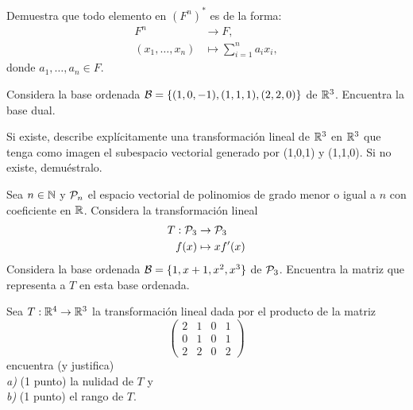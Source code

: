 \documentclass[12pt,a4paper]{book}
\newcommand{\llaves}[1]{\{#1\}}
\begin{document}
    \begin{ejercicio}
        Demuestra que todo elemento en $(F^{n})^{\ast}$ es de la forma:
        \begin{align*}
            F^{n} & \to F,\\
            (x_{1}, \dots, x_{n}) & \mapsto \sum_{i = 1}^{n}a_{i}x_{i},
        \end{align*}
        donde $a_{1}, \dots, a_{n} \in F$.
    \end{ejercicio}

    \begin{ejercicio}
        Considera la base ordenada $\BB = \llaves{(1, 0 ,-1), (1, 1, 1), (2, 2, 0)}$ de $\mathbb{R}^{3}$. Encuentra la base dual.
    \end{ejercicio}

    \begin{ejercicio}
        Si existe, describe explícitamente una transformación lineal de $\mathbb{R}^{3}$
        en $\mathbb{R}^{3}$ que tenga como imagen el subespacio vectorial generado por (1,0,1) y
        (1,1,0). Si no existe, demuéstralo.
    \end{ejercicio}

    \begin{ejercicio}
        Sea $n\in\mathbb{N}$ y $\mathcal{P}_{n}$ el espacio vectorial de polinomios
        de grado menor o igual a $n$ con coeficiente en $\mathbb{R}$. Considera la transformación
        lineal
        \begin{align*}
            T:\mathcal{P}_{3}&\to\mathcal{P}_{3}\\
            f(x)&\mapsto xf^{\prime}(x)
        \end{align*}
        Considera la base ordenada $\mathcal{B}=\{1,x+1,x^{2},x^{3}\}$ de $\mathcal{P}_{3}$. Encuentra la matriz
        que representa a $T$ en esta base ordenada.
    \end{ejercicio}

    \begin{ejercicio}
        Sea $T:\mathbb{R}^{4}\to\mathbb{R}^{3}$ la transformación lineal dada por el producto de la matriz
        \begin{equation*}
            \begin{pmatrix}
                2 & 1 & 0 & 1\\
                0 & 1 & 0 & 1\\
                2 & 2 & 0 & 2
            \end{pmatrix}
        \end{equation*}
        encuentra (y justifica)\\
        \textit{a)} (1 punto) la nulidad de $T$ y\\
        \textit{b)} (1 punto) el rango de $T$.
    \end{ejercicio}
\end{document}
